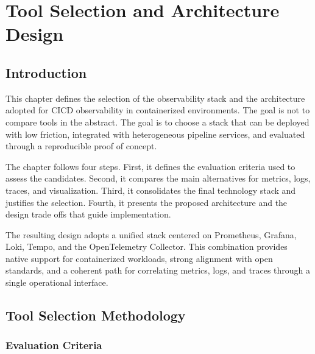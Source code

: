 
\chapter{Tool Selection and Architecture Design}
\label{chap:design}

\glsresetall

\section{Introduction}
\label{sec:design_intro}

This chapter defines the selection of the observability stack and the architecture adopted for \gls{CICD} observability in containerized environments. The goal is not to compare tools in the abstract. The goal is to choose a stack that can be deployed with low friction, integrated with heterogeneous pipeline services, and evaluated through a reproducible proof of concept.

The chapter follows four steps. First, it defines the evaluation criteria used to assess the candidates. Second, it compares the main alternatives for metrics, logs, traces, and visualization. Third, it consolidates the final technology stack and justifies the selection. Fourth, it presents the proposed architecture and the design trade offs that guide implementation.

The resulting design adopts a unified stack centered on Prometheus, Grafana, Loki, Tempo, and the OpenTelemetry Collector. This combination provides native support for containerized workloads, strong alignment with open standards, and a coherent path for correlating metrics, logs, and traces through a single operational interface.

\section{Tool Selection Methodology}
\label{sec:tool_selection}

\subsection{Evaluation Criteria}
\label{subsec:evaluation_criteria}

